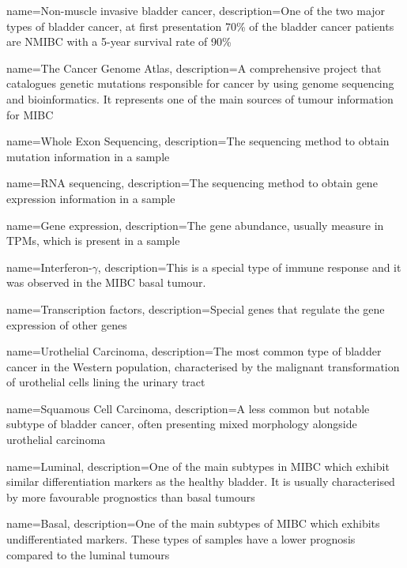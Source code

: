 {
    name=Non-muscle invasive bladder cancer,
    description={One of the two major types of bladder cancer, at first presentation 70\% of the bladder cancer patients are NMIBC with a 5-year survival rate of 90\%}
}

{
    name=The Cancer Genome Atlas,
    description={A comprehensive project that catalogues genetic mutations responsible for cancer by using genome sequencing and bioinformatics. It represents one of the main sources of tumour information for MIBC}
}

{
    name=Whole Exon Sequencing,
    description={The sequencing method to obtain mutation information in a sample}
}

{
    name=RNA sequencing,
    description={The sequencing method to obtain gene expression information in a sample}
}

{
    name=Gene expression,
    description={The gene abundance, usually measure in TPMs, which is present in a sample}
}

{
    name=Interferon-$\gamma$,
    description={This is a special type of immune response and it was observed in the MIBC basal tumour.}
}

{
    name=Transcription factors,
    description={Special genes that regulate the gene expression of other genes}
}

{
    name=Urothelial Carcinoma,
    description={The most common type of bladder cancer in the Western population, characterised by the malignant transformation of urothelial cells lining the urinary tract}
}

{
    name=Squamous Cell Carcinoma,
    description={A less common but notable subtype of bladder cancer, often presenting mixed morphology alongside urothelial carcinoma}
}


{
    name=Luminal,
    description={One of the main subtypes in MIBC which exhibit similar differentiation markers as the healthy bladder. It is usually characterised by more favourable prognostics than basal tumours}
}

{
    name=Basal,
    description={One of the main subtypes of MIBC which exhibits undifferentiated markers. These types of samples have a lower prognosis compared to the luminal tumours}
}



